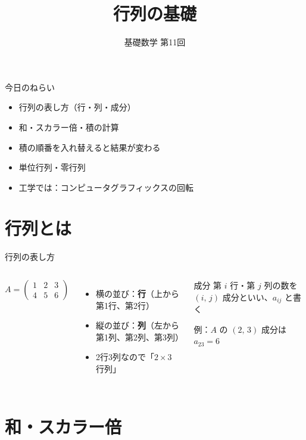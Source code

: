 \documentclass[aspectratio=169]{beamer}
\title{行列の基礎}
\subtitle{基礎数学 第11回}
\author{}
\date{}
\begin{document}
\begin{frame}
  \titlepage
\end{frame}

\begin{frame}{今日のねらい}
  \bigskip
  \begin{itemize}
    \item 行列の表し方（行・列・成分）
    \item 和・スカラー倍・積の計算
    \item 積の順番を入れ替えると結果が変わる
    \item 単位行列・零行列
    \item 工学では：コンピュータグラフィックスの回転
  \end{itemize}
\end{frame}

\section{行列とは}

\begin{frame}{行列の表し方}
  \begin{columns}[c]
      \[
        A = \begin{pmatrix} 1 & 2 & 3 \\ 4 & 5 & 6 \end{pmatrix}
      \]
      \begin{itemize}
        \item 横の並び：\textbf{行}（上から第1行、第2行）
        \item 縦の並び：\textbf{列}（左から第1列、第2列、第3列）
        \item 2行3列なので「$2 \times 3$ 行列」
      \end{itemize}
      \begin{block}{成分}
        第 $i$ 行・第 $j$ 列の数を $(i,\,j)$ 成分といい、$a_{ij}$ と書く
        \medskip

        例：$A$ の $(2,\,3)$ 成分は $a_{23} = 6$
      \end{block}
  \end{columns}
\end{frame}

\section{和・スカラー倍}
\end{document}
